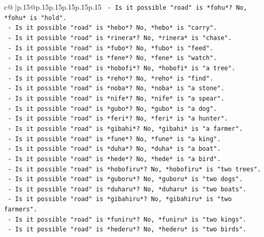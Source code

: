 \documentclass{article}
\begin{document}
{\begin{supertabular}{c@{$\;$}|p{.15\linewidth}@{}p{.15\linewidth}p{.15\linewidth}p{.15\linewidth}p{.15\linewidth}p{.15\linewidth}}
{{{\texttt{            {-} Is it possible "road" is *fohu*? No, *fohu* is "hold".} \\
\texttt{            {-} Is it possible "road" is *hebo*? No, *hebo* is "carry".} \\
\texttt{            {-} Is it possible "road" is *rinera*? No, *rinera* is "chase".} \\
\texttt{            {-} Is it possible "road" is *fubo*? No, *fubo* is "feed".} \\
\texttt{            {-} Is it possible "road" is *fene*? No, *fene* is "watch".} \\
\texttt{            {-} Is it possible "road" is *hobofi*? No, *hobofi* is "a tree".} \\
\texttt{            {-} Is it possible "road" is *reho*? No, *reho* is "find".} \\
\texttt{            {-} Is it possible "road" is *noba*? No, *noba* is "a stone".} \\
\texttt{            {-} Is it possible "road" is *nife*? No, *nife* is "a spear".} \\
\texttt{            {-} Is it possible "road" is *gubo*? No, *gubo* is "a dog".} \\
\texttt{            {-} Is it possible "road" is *feri*? No, *feri* is "a hunter".} \\
\texttt{            {-} Is it possible "road" is *gibahi*? No, *gibahi* is "a farmer".} \\
\texttt{            {-} Is it possible "road" is *fune*? No, *fune* is "a king".} \\
\texttt{            {-} Is it possible "road" is *duha*? No, *duha* is "a boat".} \\
\texttt{            {-} Is it possible "road" is *hede*? No, *hede* is "a bird".} \\
\texttt{            {-} Is it possible "road" is *hobofiru*? No, *hobofiru* is "two trees".} \\
\texttt{            {-} Is it possible "road" is *guboru*? No, *guboru* is "two dogs".} \\
\texttt{            {-} Is it possible "road" is *duharu*? No, *duharu* is "two boats".} \\
\texttt{            {-} Is it possible "road" is *gibahiru*? No, *gibahiru* is "two farmers".} \\
\texttt{            {-} Is it possible "road" is *funiru*? No, *funiru* is "two kings".} \\
\texttt{            {-} Is it possible "road" is *hederu*? No, *hederu* is "two birds".} \\
}}}
\end{supertabular}}
\end{document}
